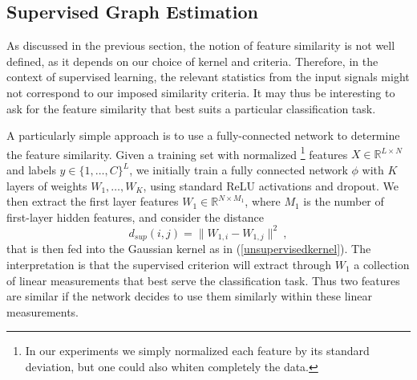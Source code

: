 \documentclass{article} %
\begin{document}

\subsection{ Supervised Graph Estimation }

As discussed in the previous section, the notion of feature similarity is not well defined, as it depends on our choice of 
kernel and criteria. Therefore, in the context of supervised learning, the relevant statistics from the input signals might not correspond to 
our imposed similarity criteria. It may thus be interesting to ask for the feature similarity that best suits a particular classification task. 

A particularly simple approach is to use a fully-connected network to determine the feature similarity. Given a training set with normalized \footnote{In our experiments we simply normalized each feature by its standard deviation, but one could also whiten completely the data.} features $X \in \mathbb{R}^{L \times N}$ 
and labels $y \in \{1,\dots,C\}^L$, we initially train a fully connected network $\phi$ with $K$ layers of weights $W_1, \dots, W_K$, using standard ReLU activations and dropout. We then extract the first layer features $W_1 \in \mathbb{R}^{N \times M_1}$, where $M_1$ is the number of first-layer hidden features, and consider the distance
\begin{equation}
\label{supervisedkernel}
d_{sup}(i, j) = \| W_{1,i} - W_{1,j} \|^2~,
\end{equation}
that is then fed into the Gaussian kernel as in (\ref{unsupervisedkernel}). The interpretation is that the supervised criterion will extract through $W_1$ a collection of linear measurements that best serve the classification task. Thus two features are similar if the network decides to use them similarly within these linear measurements.  

\end{document}
